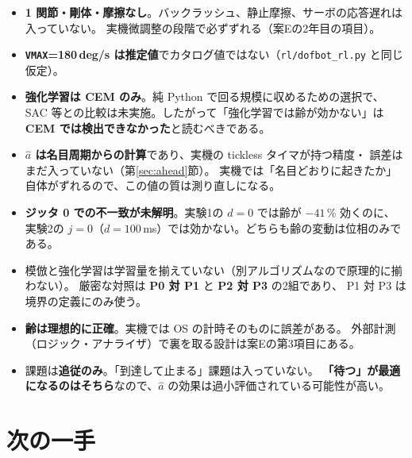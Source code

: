 \documentclass[11pt,a4paper]{article}
\newcommand{\code}[1]{\texttt{#1}}
\newcommand{\prob}[1]{\textbf{\textcolor{red!55!black}{#1}}}
\newcommand{\keyp}[1]{\textbf{\textcolor{blue!45!black}{#1}}}
\begin{document}
\begin{itemize}[leftmargin=1.4em,itemsep=3pt]
  \item \prob{1 関節・剛体・摩擦なし}。バックラッシュ、静止摩擦、サーボの応答遅れは入っていない。
        実機微調整の段階で必ずずれる（案Eの2年目の項目）。
  \item \prob{\code{VMAX}=180\,deg/s は推定値}でカタログ値ではない（\code{rl/dofbot\_rl.py} と同じ仮定）。
  \item \prob{強化学習は CEM のみ}。純 Python で回る規模に収めるための選択で、
        SAC 等との比較は未実施。したがって「強化学習では齢が効かない」は
        \keyp{CEM では検出できなかった}と読むべきである。
  \item \prob{$\hat a$ は名目周期からの計算}であり、実機の tickless タイマが持つ精度・
        誤差はまだ入っていない（第\ref{sec:ahead}節）。
        実機では「名目どおりに起きたか」自体がずれるので、この値の質は測り直しになる。
  \item \prob{ジッタ 0 での不一致が未解明}。実験1の $d=0$ では齢が $-41\,\%$ 効くのに、
        実験2の $j=0$（$d=100$\,ms）では効かない。どちらも齢の変動は位相のみである。
  \item 模倣と強化学習は学習量を揃えていない（別アルゴリズムなので原理的に揃わない）。
        厳密な対照は \keyp{P0 対 P1} と \keyp{P2 対 P3} の2組であり、
        P1 対 P3 は境界の定義にのみ使う。
  \item \prob{齢は理想的に正確}。実機では OS の計時そのものに誤差がある。
        外部計測（ロジック・アナライザ）で裏を取る設計は案Eの第3項目にある。
  \item 課題は\keyp{追従のみ}。「到達して止まる」課題は入っていない。
        \keyp{「待つ」が最適になるのはそちら}なので、$\hat a$ の効果は過小評価されている可能性が高い。
\end{itemize}

\section{次の一手}
\label{sec:next}
\end{document}
